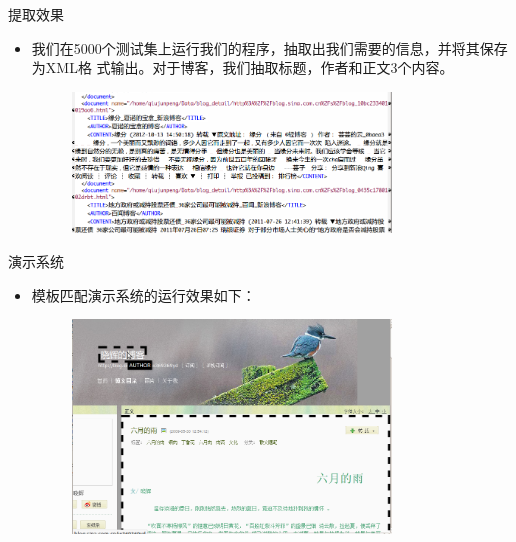 \begin{frame}[label=sec-3-5]{提取效果}
\begin{itemize}
\item 我们在5000个测试集上运行我们的程序，抽取出我们需要的信息，并将其保存为XML格
  式输出。对于博客，我们抽取标题，作者和正文3个内容。
\begin{figure}[hb]
\centering
\includegraphics[width=0.8\textwidth]{xmloutput-1}
\end{figure}
\end{itemize}
\end{frame}

\begin{frame}[label=sec-3-6]{演示系统}
\begin{itemize}
\item 模板匹配演示系统的运行效果如下：
\begin{figure}[hb]
  \centering
  \includegraphics[width=0.8\textwidth]{demo-output-new}
\end{figure}
\end{itemize}
\end{frame}

